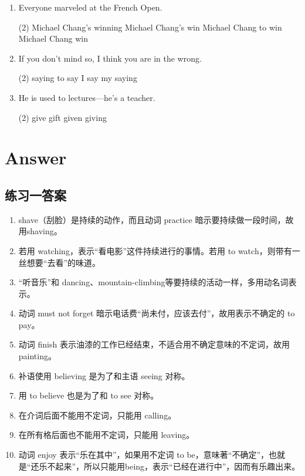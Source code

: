 \begin{enumerate}
\item Everyone marveled at \ttu the French Open.
  \begin{tasks}(2)
    \task Michael Chang's winning
    \task Michael Chang's win
    \task Michael Chang to win
    \task Michael Chang win
  \end{tasks}

\item If you don't mind \ttu so, I think you are in the wrong.
  \begin{tasks}(2)
    \task saying
    \task to say
    \task I say
    \task my saying
  \end{tasks}

\item He is used to \ttu lectures—he's a teacher.
  \begin{tasks}(2)
    \task give
    \task gift
    \task given
    \task giving
  \end{tasks}

\end{enumerate}

\section{Answer}
\subsection{练习一答案}
\begin{enumerate}
\item shave（刮脸）是持续的动作，而且动词 practice 暗示要持续做一段时间，故用shaving。
\item 若用 watching，表示“看电影”这件持续进行的事情。若用 to watch，则带有一丝想要“去看”的味道。
\item “听音乐”和 dancing、mountain-climbing等要持续的活动一样，多用动名词表示。
\item 动词 must not forget 暗示电话费“尚未付，应该去付”，故用表示不确定的 to pay。
\item 动词 finish 表示油漆的工作已经结束，不适合用不确定意味的不定词，故用painting。
\item 补语使用 believing 是为了和主语 seeing 对称。
\item 用 to believe 也是为了和 to see 对称。
\item 在介词后面不能用不定词，只能用 calling。
\item 在所有格后面也不能用不定词，只能用 leaving。
\item 动词 enjoy 表示“乐在其中”，如果用不定词 to be，意味著“不确定”，也就是“还乐不起来”，所以只能用being，表示“已经在进行中”，因而有乐趣出来。
\end{enumerate}

